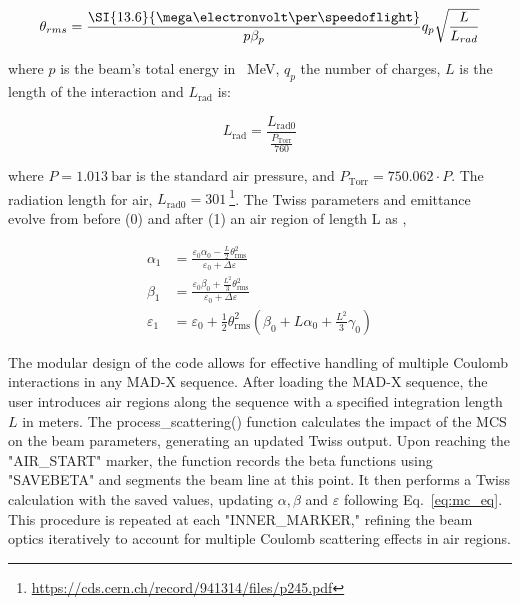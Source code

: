 \documentclass[a4paper,
               biblatex,     %
               ]{jacow}
\begin{document}
\[
\theta_{rms} = \frac{\SI{13.6}{\mega\electronvolt\per\speedoflight}}{p\beta_{p}}q_{p}\sqrt\frac{L}{L_{rad}}
\]

\noindent where $p$ is the beam's total energy in \SI{}{\mega\electronvolt}, $q_{p}$ the number of charges, $L$ is the length of the interaction and $L_{\text{rad}}$ is:

\[
L_{\text{rad}} = \frac{L_{\text{rad0}}}{\frac{P_{\text{Torr}}}{760}}
\]

\noindent where $P=\SI{1.013}{\bar}$ is the standard air pressure, and $P_{\text{Torr}} = 750.062\cdot P$. The radiation length for air, $L_{\text{rad0}}=\SI{301}{}$\footnote{\href{https://cds.cern.ch/record/941314/files/p245.pdf}{{https://cds.cern.ch/record/941314/files/p245.pdf}}}. The Twiss parameters and emittance evolve from before (0) and after (1) an air region of length L as \cite{mullerDescriptionBeamMatterInteraction2001c},


\begin{equation}
\label{eq:mc_eq}
\begin{aligned}
\alpha_{1} &= \frac{\varepsilon_0 \alpha_0 - \frac{L}{2} \theta_{\text{rms}}^2}{\varepsilon_0 + \Delta \varepsilon}\\
\beta_{1} &= \frac{\varepsilon_0 \beta_0 + \frac{L^2}{3} \theta_{\text{rms}}^2}{\varepsilon_0 + \Delta \varepsilon}\\
\varepsilon_{1} &= \varepsilon_0 + \frac{1}{2} \theta_{\text{rms}}^2 \left( \beta_0 + L \alpha_0 + \frac{L^2}{3} \gamma_0 \right)
\end{aligned}
\end{equation}

The modular design of the code \cite{PybtMasterABT2023a} allows for effective handling of multiple Coulomb interactions in any MAD-X sequence. After loading the MAD-X sequence, the user introduces air regions along the sequence with a specified integration length $L$ in meters. The process\_scattering() function calculates the impact of the MCS on the beam parameters, generating an updated Twiss output. Upon reaching the "AIR\_START" marker, the function records the beta functions using "SAVEBETA" and segments the beam line at this point. It then performs a Twiss calculation with the saved values, updating $\alpha, \beta$ and $\varepsilon$ following Eq.~\eqref{eq:mc_eq}. This procedure is repeated at each "INNER\_MARKER," refining the beam optics iteratively to account for multiple Coulomb scattering effects in air regions.
\end{document}
